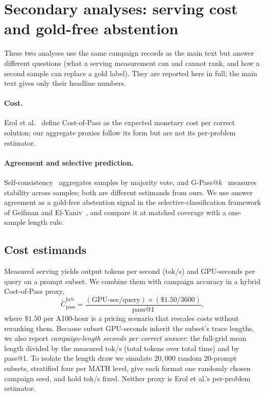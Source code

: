 \documentclass[11pt,a4paper]{article}
\begin{document}
\FloatBarrier
\section{Secondary analyses: serving cost and gold-free abstention}
\label{app:secondary}
These two analyses use the same campaign records as the main text but answer different questions (what a serving measurement can and cannot rank, and how a second sample can replace a gold label). They are reported here in full; the main text gives only their headline numbers.

\paragraph{Cost.} Erol et al.~\cite{erol2025costofpass} define Cost-of-Pass as the expected monetary cost per correct solution; our aggregate proxies follow its form but are not its per-problem estimator.

\paragraph{Agreement and selective prediction.} Self-consistency~\cite{wang2022selfconsistency} aggregates samples by majority vote, and G-Pass@$k$~\cite{liu2025gpass} measures stability across samples; both are different estimands from ours. We use answer agreement as a gold-free abstention signal in the selective-classification framework of Geifman and El-Yaniv~\cite{geifman2017selective}, and compare it at matched coverage with a one-sample length rule.

\subsection{Cost estimands}
\label{sec:cost-def}
Measured serving yields output tokens per second (tok/s) and GPU-seconds per query on a prompt subset. We combine them with campaign accuracy in a hybrid Cost-of-Pass proxy,
\begin{equation}
\widetilde{C}_{\mathrm{pass}}^{\mathrm{hyb}} = \frac{(\text{GPU-sec/query})\times (\$1.50/3600)}{\mathrm{pass@1}},
\end{equation}
where $\$1.50$ per A100-hour is a pricing scenario that rescales costs without reranking them. Because subset GPU-seconds inherit the subset's trace lengths, we also report \emph{campaign-length seconds per correct answer}: the full-grid mean length divided by the measured tok/s (total tokens over total time) and by pass@1. To isolate the length draw we simulate $20{,}000$ random 20-prompt subsets, stratified four per MATH level, give each format one randomly chosen campaign seed, and hold tok/s fixed. Neither proxy is Erol et al.'s per-problem estimator.
\end{document}
